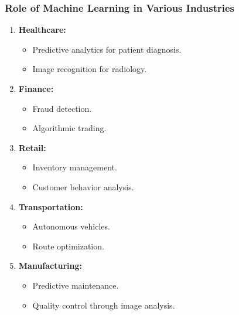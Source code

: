 \documentclass{beamer}
\begin{document}
\begin{frame}[fragile]
    \frametitle{Role of Machine Learning in Various Industries}
    \begin{enumerate}
        \item \textbf{Healthcare:}
            \begin{itemize}
                \item Predictive analytics for patient diagnosis.
                \item Image recognition for radiology.
            \end{itemize}
        \item \textbf{Finance:}
            \begin{itemize}
                \item Fraud detection.
                \item Algorithmic trading.
            \end{itemize}
        \item \textbf{Retail:}
            \begin{itemize}
                \item Inventory management.
                \item Customer behavior analysis.
            \end{itemize}
        \item \textbf{Transportation:}
            \begin{itemize}
                \item Autonomous vehicles.
                \item Route optimization.
            \end{itemize}
        \item \textbf{Manufacturing:}
            \begin{itemize}
                \item Predictive maintenance.
                \item Quality control through image analysis.
            \end{itemize}
    \end{enumerate}
\end{frame}
\end{document}
